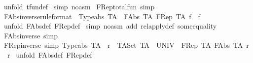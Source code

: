 \begin{isabellebody}
%
\isadelimproof
%
\endisadelimproof
%
\isatagproof
{}\isamarkupfalse%
\ {\isacharparenleft}unfold\ tfun{\isacharunderscore}def{\isacharparenright}\isanewline
{}\isamarkupfalse%
\ {\isacharparenleft}simp\ {\isacharparenleft}no{\isacharunderscore}asm{\isacharparenright}{\isacharparenright}\isanewline
{}\isamarkupfalse%
%
\endisatagproof
{\isafoldproof}%
%
\isadelimproof
\isanewline
%
\endisadelimproof
\isanewline
{}\isamarkupfalse%
\ FRep{\isacharunderscore}total{\isacharunderscore}fun\ {\isacharbrackleft}simp{\isacharbrackright}\isanewline
\isanewline
{}\isamarkupfalse%
\ FAbs{\isacharunderscore}inverse{\isacharbrackleft}rule{\isacharunderscore}format{\isacharbrackright}\ {\isacharcolon}\ {\isachardoublequoteopen}Typeabs\ TA\ {\isacharminus}{\isacharminus}{\isachargreater}\ {\isacharparenleft}FAbs\ TA\ {\isacharparenleft}FRep\ TA\ f{\isacharparenright}{\isacharparenright}\ {\isacharequal}\ f{\isachardoublequoteclose}\isanewline
%
\isadelimproof
%
\endisadelimproof
%
\isatagproof
{}\isamarkupfalse%
\ {\isacharparenleft}unfold\ FAbs{\isacharunderscore}def\ FRep{\isacharunderscore}def{\isacharparenright}\isanewline
{}\isamarkupfalse%
\ {\isacharparenleft}simp\ {\isacharparenleft}no{\isacharunderscore}asm{\isacharparenright}\ add{\isacharcolon}\ rel{\isacharunderscore}apply{\isacharunderscore}def\ some{\isacharunderscore}equality{\isacharparenright}\isanewline
{}\isamarkupfalse%
%
\endisatagproof
{\isafoldproof}%
%
\isadelimproof
\isanewline
%
\endisadelimproof
\isanewline
{}\isamarkupfalse%
\ FAbs{\isacharunderscore}inverse\ {\isacharbrackleft}simp{\isacharbrackright}\isanewline
\isanewline
{}\isamarkupfalse%
\ FRep{\isacharunderscore}inverse\ {\isacharbrackleft}simp{\isacharbrackright}{\isacharcolon}\ {\isachardoublequoteopen}Typeabs\ TA\ {\isacharminus}{\isacharminus}{\isachargreater}\ r\ {\isacharcolon}\ {\isacharparenleft}{\isacharparenleft}TASet\ TA{\isacharparenright}\ {\isacharminus}{\isacharminus}{\isacharminus}{\isachargreater}\ UNIV{\isacharparenright}\ {\isacharminus}{\isacharminus}{\isachargreater}\ {\isacharparenleft}FRep\ TA\ {\isacharparenleft}FAbs\ TA\ r{\isacharparenright}{\isacharparenright}\ {\isacharequal}\ r{\isachardoublequoteclose}\isanewline
%
\isadelimproof
%
\endisadelimproof
%
\isatagproof
{}\isamarkupfalse%
\ {\isacharparenleft}unfold\ FAbs{\isacharunderscore}def\ FRep{\isacharunderscore}def{\isacharparenright}\isanewline
{}\isamarkupfalse%

\end{isabellebody}
